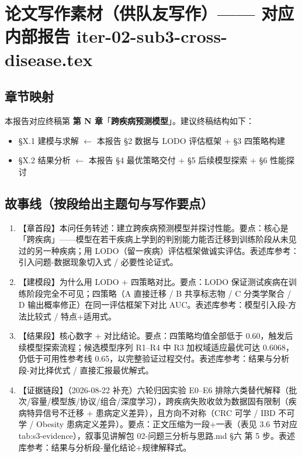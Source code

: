 \documentclass{article}   %
\begin{document}
\section{论文写作素材（供队友写作）—— 对应内部报告 iter-02-sub3-cross-disease.tex}

\subsection{章节映射}

本报告对应终稿第 \textbf{第 N 章}「\textbf{跨疾病预测模型}」。建议终稿结构如下：
\begin{itemize}
  \item §X.1 建模与求解 \quad $\leftarrow$ 本报告 §2 数据与 LODO 评估框架 + §3 四策略构建
  \item §X.2 结果分析 \quad $\leftarrow$ 本报告 §4 最优策略交付 + §5 后续模型探索 + §6 性能探讨
\end{itemize}

\subsection{故事线（按段给出主题句与写作要点）}

\begin{enumerate}
  \item 【章首段】本问任务转述：建立跨疾病预测模型并探讨性能。要点：核心是「跨疾病」——模型在若干疾病上学到的判别能力能否迁移到训练阶段从未见过的另一种疾病；用 LODO（留一疾病）评估框架做诚实评估。表述库参考：引入问题-数据现象切入式 / 必要性论证式。
  \item 【建模段】为什么用 LODO + 四策略对比。要点：LODO 保证测试疾病在训练阶段完全不可见；四策略（A 直接迁移 / B 共享标志物 / C 分类学聚合 / D 输出概率修正）在同一评估框架下对比 AUC。表述库参考：模型引入段-方法比较式 / 特点+适用式。
  \item 【结果段】核心数字 + 对比结论。要点：四策略均值全部低于 0.60，触发后续模型探索流程；候选模型序列 R1--R4 中 R3 加权域适应最优可达 0.6068，仍低于可用性参考线 0.65，以完整验证过程交付。表述库参考：结果与分析段-对比择优式 / 直接汇报最优解式。
  \item 【证据链段】（2026-08-22 补充）六轮归因实验 E0--E6 排除六类替代解释（批次/容量/模型族/协议/组合/深度学习），跨疾病失败收敛为数据固有限制（疾病特异信号不迁移 + 患病定义差异），且方向不对称（CRC 可学 / IBD 不可学 / Obesity 患病定义差异）。要点：正文压缩为一段+一表（表见 3.6 节对应 tab:s3-evidence），叙事见讲解包 02-问题三分析与思路.md §六 第 5 步。表述库参考：结果与分析段-量化结论+规律解释式。
\end{enumerate}
\end{document}
